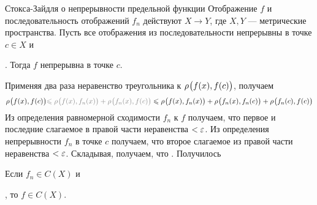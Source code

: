 
\begin{teor}[https://www.youtube.com/live/oGN0SkfpZME?si=rzyEi2Hd6nOeRw-i&t=11638]{Стокса-Зайдля о непрерывности предельной функции}\label{ст-зд}%
	Отображение $f$ и последовательность отображений $f_n$ действуют $X \to Y$, где $X, Y$ --- метрические пространства. Пусть все отображения из последовательности непрерывны в точке $c \in X$ и\!. Тогда $f$ непрерывна в точке $c$.
\end{teor} %

\begin{prf} %
	Применяя два раза неравенство треугольника к $\rho_{}\bigl(f(x), f(c)\bigr)$, получаем 
	\[\bmetr{f(x), f(c)} \uns{\< \bmetr{f(x), f_n(x)} + \bmetr{f_n(x), f(c)}}\< \bmetr{f(x), f_n(x)} + \bmetr{f_n(x), f_n(c)} + \bmetr{f_n(c), f(c)}\]
	Из определения равномерной сходимости $f_n$ к $f$
	\linebreak
	 получаем, что  первое и последние слагаемое в правой части неравенства $< \varepsilon$. Из определения непрерывности $f_n$ в точке $c$ 
	 получаем, что  второе слагаемое из правой части неравенства $< \varepsilon$. Складывая, получаем, что .
	 Получилось  
\end{prf} %

\begin{slv}[https://www.youtube.com/live/oGN0SkfpZME?si=8DDuSzi86njoQaMf&t=11737]\label{непр.на X}
	Если $f_n \in C(X)$ и\!, то $f \in C(X)$. 
\end{slv} %

